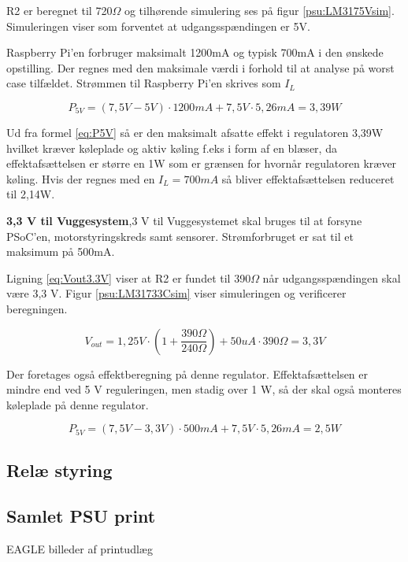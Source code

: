 R2 er beregnet til 720$\Omega$ og tilhørende simulering ses på figur \ref{psu:LM3175Vsim}. Simuleringen viser som forventet at udgangsspændingen er 5V. 


Raspberry Pi'en forbruger maksimalt 1200mA og typisk 700mA i den ønskede opstilling. Der regnes med den maksimale værdi i forhold til at analyse på worst case tilfældet. Strømmen til Raspberry Pi'en skrives som $I_{L}$

\begin{equation} 
{ P }_{ 5V }=(7,5V-5V)\cdot 1200mA+7,5V\cdot 5,26mA=3,39W
\label{eq:P5V}
\end{equation}

Ud fra formel \ref{eq:P5V} så er den maksimalt afsatte effekt i regulatoren 3,39W hvilket kræver køleplade og aktiv køling f.eks i form af en blæser, da effektafsættelsen er større en 1W som er grænsen for hvornår regulatoren kræver køling. Hvis der regnes med en $I_{L}=700mA$ så bliver effektafsættelsen reduceret til 2,14W.



\textbf{3,3 V til Vuggesystem},3 V til Vuggesystemet skal bruges til at forsyne PSoC'en, motorstyringskreds samt sensorer. Strømforbruget er sat til et maksimum på 500mA.

Ligning \ref{eq:Vout3.3V} viser at R2 er fundet til 390$\Omega$ når udgangsspændingen skal være 3,3 V. Figur \ref{psu:LM31733Csim} viser simuleringen og verificerer beregningen. 

\begin{equation} 
{ V }_{ out }=1,25V\cdot \left( 1+\frac { 390\Omega  }{ 240\Omega  }  \right) +50uA\cdot 390\Omega =3,3V
\label{eq:Vout3.3V}
\end{equation}


Der foretages også effektberegning på denne regulator. Effektafsættelsen er mindre end ved 5 V reguleringen, men stadig over 1 W, så der skal også monteres køleplade på denne regulator.

\begin{equation} 
{ P }_{ 5V }=(7,5V-3,3V)\cdot 500mA+7,5V\cdot 5,26mA=2,5W
\label{eq:P3.3V}
\end{equation}


\subsection{Relæ styring}

\subsection{Samlet PSU print}



EAGLE billeder af printudlæg 